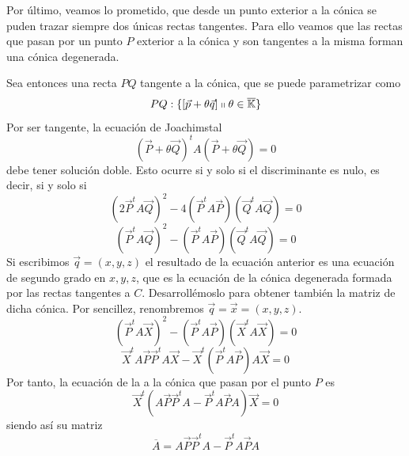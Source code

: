Por último, veamos lo prometido, que desde un punto exterior a la cónica se puden trazar siempre dos únicas rectas tangentes. Para ello veamos que las rectas que pasan por un punto $P$ exterior a la cónica y son tangentes a la misma forman una cónica degenerada.

Sea entonces una recta $PQ$ tangente a la cónica, que se puede parametrizar como 
\[PQ:\{\left [ \vec{p}+\theta\vec{q} \right ]\shortparallel\theta\in\overline{\mathbb{K}}\}\]
Por ser tangente, la ecuación de Joachimstal
\[(\vec{P}+\theta \vec{Q})^tA(\vec{P}+\theta \vec{Q})=0\]
debe tener solución doble. Esto ocurre si y solo si el discriminante es nulo, es decir, si y solo si
\[(2\vec{P}^tA\vec{Q})^2-4(\vec{P}^tA\vec{P})(\vec{Q}^tA\vec{Q})=0\]
\[(\vec{P}^tA\vec{Q})^2-(\vec{P}^tA\vec{P})(\vec{Q}^tA\vec{Q})=0\]
Si escribimos $\vec{q}=(x,y,z)$ el resultado de la ecuación anterior es una ecuación de segundo grado en $x,y,z$, que es la ecuación de la cónica degenerada formada por las rectas tangentes a $C$. Desarrollémoslo para obtener también la matriz de dicha cónica. Por sencillez, renombremos $\vec{q}=\vec{x}=(x,y,z)$.
\[(\vec{P}^tA\vec{X})^2-(\vec{P}^tA\vec{P})(\vec{X}^tA\vec{X})=0\]
\[\vec{X}^tA\vec{P}\vec{P}^tA\vec{X}-\vec{X}^t(\vec{P}^tA\vec{P})A\vec{X}=0\]
Por tanto, la ecuación de la  a la cónica que pasan por el punto $P$ es
\begin{equation}
	\vec{X}^t(A\vec{P}\vec{P}^tA-\vec{P}^tA\vec{P}A)\vec{X}=0
\end{equation}
siendo así su matriz
\begin{equation}
\overline{A}=A\vec{P}\vec{P}^tA-\vec{P}^tA\vec{P}A
\end{equation}

